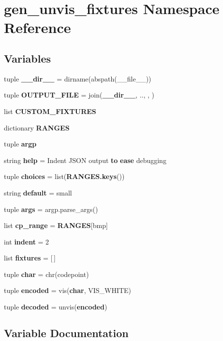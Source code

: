 \section{gen\+\_\+unvis\+\_\+fixtures Namespace Reference}
\label{namespacegen__unvis__fixtures}
\subsection*{Variables}
\begin{DoxyCompactItemize}
\item 
tuple {\bf \+\_\+\+\_\+dir\+\_\+\+\_\+} = dirname(abspath(\+\_\+\+\_\+file\+\_\+\+\_\+))
\item 
tuple {\bf O\+U\+T\+P\+U\+T\+\_\+\+F\+I\+L\+E} = join({\bf \+\_\+\+\_\+dir\+\_\+\+\_\+}, \textquotesingle{}..\textquotesingle{}, \textquotesingle{}, \textquotesingle{})
\item 
list {\bf C\+U\+S\+T\+O\+M\+\_\+\+F\+I\+X\+T\+U\+R\+E\+S}
\item 
dictionary {\bf R\+A\+N\+G\+E\+S}
\item 
tuple {\bf argp}
\item 
string {\bf help} = \textquotesingle{}Indent J\+S\+O\+N output {\bf to} {\bf ease} debugging\textquotesingle{}
\item 
tuple {\bf choices} = list({\bf R\+A\+N\+G\+E\+S.\+keys}())
\item 
string {\bf default} = \textquotesingle{}small\textquotesingle{}
\item 
tuple {\bf args} = argp.\+parse\+\_\+args()
\item 
list {\bf cp\+\_\+range} = {\bf R\+A\+N\+G\+E\+S}[\textquotesingle{}bmp\textquotesingle{}]
\item 
int {\bf indent} = 2
\item 
list {\bf fixtures} = [$\,$]
\item 
tuple {\bf char} = chr(codepoint)
\item 
tuple {\bf encoded} = vis({\bf char}, V\+I\+S\+\_\+\+W\+H\+I\+T\+E)
\item 
tuple {\bf decoded} = unvis({\bf encoded})
\end{DoxyCompactItemize}


\subsection{Variable Documentation}
